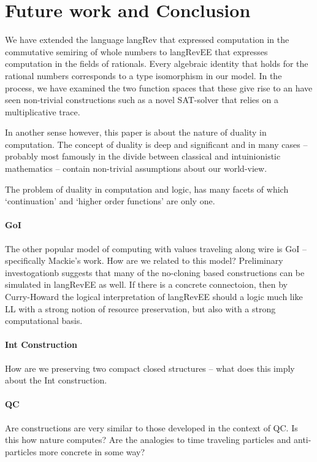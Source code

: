 \documentclass[preprint]{sigplanconf}
\begin{document}
\section{Future work and Conclusion}
\label{sec:conc}

We have extended the language {{langRev}} that expressed computation
in the commutative semiring of whole numbers to {{langRevEE}} that
expresses computation in the fields of rationals.  Every algebraic
identity that holds for the rational numbers corresponds to a type
isomorphism in our model.  In the process, we have examined the two
function spaces that these give rise to an have seen non-trivial
constructions such as a novel SAT-solver that relies on a
multiplicative trace.

In another sense however, this paper is about the nature of duality in
computation. The concept of duality is deep and significant and in
many cases -- probably most famously in the divide between classical
and intuinionistic mathematics -- contain non-trivial assumptions
about our world-view.

The problem of duality in computation and logic, has many facets of
which `continuation' and `higher order functions' are only one. 

\paragraph*{GoI}
The other popular model of computing with values traveling along wire
is GoI -- specifically Mackie's work. How are we related to this
model? Preliminary investogationb suggests that many of the no-cloning
based constructions can be simulated in {{langRevEE}} as well. If
there is a concrete connectoion, then by Curry-Howard the logical
interpretation of {{langRevEE}} should a logic much like LL with a
strong notion of resource preservation, but also with a strong
computational basis.

\paragraph*{Int Construction}
How are we preserving two compact closed structures -- what does this
imply about the Int construction. 

\paragraph*{QC} 
Are constructions are very similar to those developed in the context
of QC. Is this how nature computes? Are the analogies to time
traveling particles and anti-particles more concrete in some way? 
\end{document}
